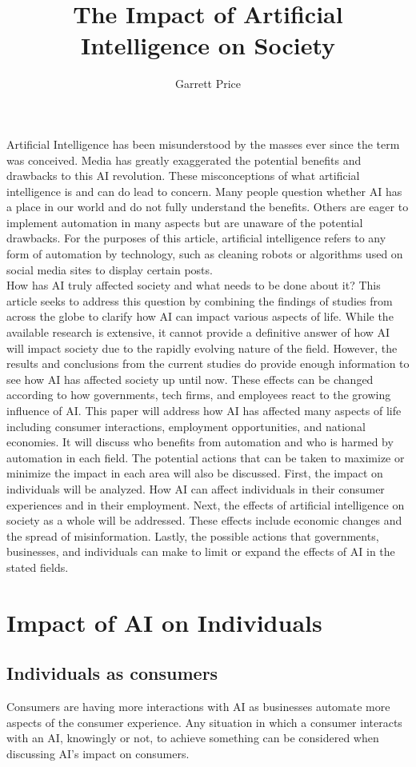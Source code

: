 \documentclass[12pt, man]{apa6}
\title{The Impact of Artificial Intelligence on Society}
\author{Garrett Price}
\affiliation{Brigham Young University}
\begin{document}
\maketitle
Artificial Intelligence has been misunderstood by the masses ever since the term was conceived.  Media has greatly exaggerated the potential
benefits and drawbacks to this AI revolution.  These misconceptions of what artificial intelligence is and can do lead to concern. Many people question
whether AI has a place in our world and do not fully understand the benefits. Others are eager to implement automation in many aspects but are unaware of the
potential drawbacks.  For the purposes of this article, artificial intelligence refers to any form of automation by technology, such as cleaning robots or algorithms used on social media sites to display certain posts.\\
How has AI truly affected society and what needs to be done about it? This article seeks to address this question by combining the findings of studies from across the globe to clarify how AI can impact various aspects of life.  While the available research is extensive, it cannot provide a definitive answer of how AI will impact society due to the rapidly evolving nature of the field.  However, the results and conclusions from the current studies do provide enough information to see how AI has affected society up until now.  These effects can be changed according to how governments, tech firms, and employees react to the growing influence of AI.  This paper will address how AI has affected many aspects of life including consumer interactions, employment opportunities, and national economies.  It will discuss who benefits from automation and who is harmed by automation in each field.  The potential actions that can be taken to maximize or minimize the impact in each area will also be discussed.  First, the impact on individuals will be analyzed.  How AI can affect individuals in their consumer experiences and in their employment.  Next, the effects of artificial intelligence on society as a whole will be addressed.  These effects include economic changes and the spread of misinformation.  Lastly, the possible actions that governments, businesses, and individuals can make to limit or expand the effects of AI in the stated fields.
\newpage
\section*{Impact of AI on Individuals}
\subsection*{Individuals as consumers}
Consumers are having more interactions with AI as businesses automate more aspects of the consumer experience.  Any situation in which a consumer interacts with an AI, knowingly or not, to achieve something can be considered when discussing AI's impact on consumers.\\
\end{document}
